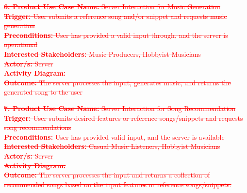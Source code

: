 \documentclass[12pt]{article}
\begin{document}
\textcolor{red}{\sout{\textbf{6. Product Use Case Name:} Server Interaction for Music Generation}} \\
\textcolor{red}{\sout{\textbf{Trigger:} User submits a reference song and/or snippet and requests music generation}} \\
\textcolor{red}{\sout{\textbf{Preconditions:} User has provided a valid input through, and the server is operational}} \\
\textcolor{red}{\sout{\textbf{Interested Stakeholders:} Music Producers, Hobbyist Musicians }}\\
\textcolor{red}{\sout{\textbf{Actor/s:} Server}} \\
\textcolor{red}{\sout{\textbf{Activity Diagram:}}} \\
\textcolor{red}{\sout{\textbf{Outcome:} The server processes the input, generates music, and returns the generated song to the user}}

\vspace{1cm}

\textcolor{red}{\sout{\textbf{7. Product Use Case Name:} Server Interaction for Song Recommendation}} \\
\textcolor{red}{\sout{\textbf{Trigger:} User submits desired features or reference songs/snippets and requests song recommendations}} \\
\textcolor{red}{\sout{\textbf{Preconditions:} User has provided valid input, and the server is available}} \\
\textcolor{red}{\sout{\textbf{Interested Stakeholders:} Casual Music Listeners, Hobbyist Musicians}} \\
\textcolor{red}{\sout{\textbf{Actor/s:} Server}} \\
\textcolor{red}{\sout{\textbf{Activity Diagram:}}} \\
\textcolor{red}{\sout{\textbf{Outcome:} The server processes the input and returns a collection of recommended songs based on the input features or reference songs/snippets.}}

\vspace{1cm}
\end{document}
